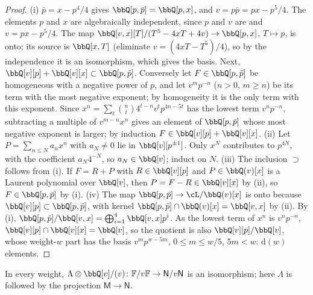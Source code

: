 \begin{proof}
(i) $\bar p=x-p^4/4$ gives $\bbQ[p,\bar p]=\bbQ[p,x]$, and $v=p\bar p=px-p^5/4$. The elements $p$ and $x$ are algebraically independent, since $p$ and $v$ are and $v=px-p^5/4$. The map $\bbQ[v,x][T]/(T^5-4xT+4v)\to\bbQ[p,x]$, $T\mapsto p$, is onto; its source is $\bbQ[x,T]$ (eliminate $v=(4xT-T^5)/4$), so by the independence it is an isomorphism, which gives the basis. Next, $\bbQ[v][p]+\bbQ[v][x]\subset\bbQ[p,\bar p]$. Conversely let $F\in\bbQ[p,\bar p]$ be homogeneous with a negative power of $p$, and let $v^mp^{-n}$ ($n>0$, $m\geq n$) be its term with the most negative exponent; by homogeneity it is the only term with this exponent. Since $x^n=\sum_t\binom nt4^{t-n}v^tp^{4n-5t}$ has the lowest term $v^np^{-n}$, subtracting a multiple of $v^{m-n}x^n$ gives an element of $\bbQ[p,\bar p]$ whose most negative exponent is larger; by induction $F\in\bbQ[v][p]+\bbQ[v][x]$. (ii) Let $P=\sum_{n\leq N}a_nx^n$ with $a_N\neq 0$ lie in $\bbQ[v][p^{\pm1}]$. Only $x^N$ contributes to $p^{4N}$, with the coefficient $a_N4^{-N}$, so $a_N\in\bbQ[v]$; induct on $N$. (iii) The inclusion $\supset$ follows from (i). If $F=R+P$ with $R\in\bbQ[v][p]$ and $P\in\bbQ(v)[x]$ is a Laurent polynomial over $\bbQ[v]$, then $P=F-R\in\bbQ[v][x]$ by (ii), so $F\in\bbQ[p,\bar p]$ by (i). (iv) The map $\bbQ[p,\bar p]\to\cL/\bbQ(v)[x]$ is onto because $\bbQ[v][p]\subset\bbQ[p,\bar p]$, with kernel $\bbQ[p,\bar p]\cap\bbQ(v)[x]=\bbQ[v,x]$ by (ii). By (i), $\bbQ[p,\bar p]/\bbQ[v,x]=\bigoplus_{i=1}^4\bbQ[v,x]p^i$. As the lowest term of $x^n$ is $v^np^{-n}$, $\bbQ[v][p]\cap\bbQ[v][x]=\bbQ[v]$, so the quotient is also $\bbQ[v][p]/\bbQ[v]$, whose weight-$w$ part has the basis $v^mp^{w-5m}$, $0\leq m\leq w/5$, $5m<w$: $\mathrm d(w)$ elements.
\end{proof}

\begin{lem}
\label{lem:mod-modv}
In every weight, $\Lambda\otimes\bbQ[v]/(v)\colon\mathbb F/v\mathbb F\to\mathsf N/v\mathsf N$ is an isomorphism; here $\Lambda$ is followed by the projection $\mathsf M\to\mathsf N$.
\end{lem}


